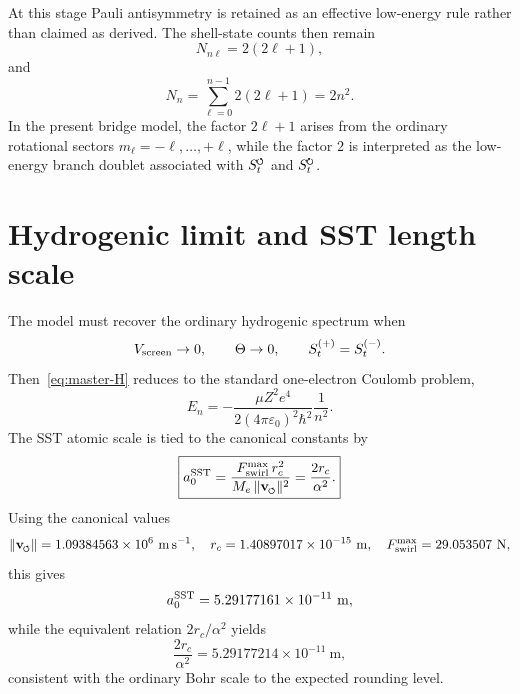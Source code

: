 \documentclass[11pt,a4paper]{article}
\newcommand{\swirlarrow}{\mathchoice{\mkern-2mu\scriptstyle\boldsymbol{\circlearrowleft}}{\mkern-2mu\scriptstyle\boldsymbol{\circlearrowleft}}{\mkern-2mu\scriptscriptstyle\boldsymbol{\circlearrowleft}}{\mkern-2mu\scriptscriptstyle\boldsymbol{\circlearrowleft}}}
\newcommand{\swirlarrowcw}{\mathchoice{\mkern-2mu\scriptstyle\boldsymbol{\circlearrowright}}{\mkern-2mu\scriptstyle\boldsymbol{\circlearrowright}}{\mkern-2mu\scriptscriptstyle\boldsymbol{\circlearrowright}}{\mkern-2mu\scriptscriptstyle\boldsymbol{\circlearrowright}}}
\newcommand{\vswirl}{\mathbf{v}_{\swirlarrow}}
\newcommand{\SwirlClock}{S_t^{\swirlarrow}}
\newcommand{\SwirlClockcw}{S_t^{\swirlarrowcw}}
\newcommand{\rc}{r_c}
\begin{document}
At this stage Pauli antisymmetry is retained as an effective low-energy rule rather than claimed as derived. The shell-state counts then remain
\begin{equation}
\label{eq:subshell-count}
N_{n\ell}=2(2\ell+1),
\end{equation}
and
\begin{equation}
\label{eq:shell-count}
N_n=\sum_{\ell=0}^{n-1}2(2\ell+1)=2n^2.
\end{equation}
In the present bridge model, the factor $2\ell+1$ arises from the ordinary rotational sectors $m_\ell=-\ell,\ldots,+\ell$, while the factor $2$ is interpreted as the low-energy branch doublet associated with $\SwirlClock$ and $\SwirlClockcw$.

\section{Hydrogenic limit and SST length scale}
The model must recover the ordinary hydrogenic spectrum when
\begin{equation}
V_{\rm screen}\to 0,
\qquad
\Theta\to 0,
\qquad
S_t^{(+)}=S_t^{(-)}.
\end{equation}
Then~\eqref{eq:master-H} reduces to the standard one-electron Coulomb problem,
\begin{equation}
\label{eq:En}
E_n=-\frac{\mu Z^2 e^4}{2(4\pi\varepsilon_0)^2\hbar^2}\frac{1}{n^2}.
\end{equation}
The SST atomic scale is tied to the canonical constants by
\begin{equation}
\label{eq:a0-sst}
\boxed{
a_0^{\rm SST}
=
\frac{F_{\rm swirl}^{\max}\,\rc^2}{M_e\,\lVert\vswirl\rVert^2}
=
\frac{2\rc}{\alpha^2}.
}
\end{equation}
Using the canonical values
\begin{equation}
\lVert\vswirl\rVert = 1.09384563\times 10^6\ \mathrm{m\,s^{-1}},
\quad
\rc = 1.40897017\times 10^{-15}\ \mathrm{m},
\quad
F_{\rm swirl}^{\max}=29.053507\ \mathrm{N},
\end{equation}
this gives
\begin{equation}
\label{eq:a0-num}
a_0^{\rm SST}
=
5.29177161\times 10^{-11}\ \mathrm{m},
\end{equation}
while the equivalent relation $2\rc/\alpha^2$ yields
\begin{equation}
\label{eq:a0-num2}
\frac{2\rc}{\alpha^2}=5.29177214\times 10^{-11}\ \mathrm{m},
\end{equation}
consistent with the ordinary Bohr scale to the expected rounding level.
\end{document}
